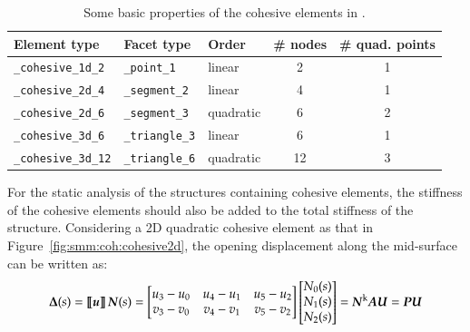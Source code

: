 \begin{table}[!htb]
\begin{center}
\begin{tabular}{l|llcc}
\toprule
Element type & Facet type & Order & \# nodes & \# quad. points  \\
\midrule
\texttt{\_cohesive\_1d\_2} & \texttt{\_point\_1} & linear & 2 & 1  \\
\hline
\texttt{\_cohesive\_2d\_4} & \texttt{\_segment\_2} & linear & 4 & 1  \\
\texttt{\_cohesive\_2d\_6} & \texttt{\_segment\_3} & quadratic & 6 & 2  \\
\hline
\texttt{\_cohesive\_3d\_6} & \texttt{\_triangle\_3} & linear & 6 & 1  \\
\texttt{\_cohesive\_3d\_12} & \texttt{\_triangle\_6} & quadratic & 12 & 3  \\
\bottomrule
\end{tabular}
\end{center}
\caption{Some basic properties of the cohesive elements in \akantu.}
\label{tab:cohesive_elements}
\end{table}

For the static analysis of the structures containing cohesive
elements, the stiffness of the cohesive elements should also be added
to the total stiffness of the structure. Considering a 2D quadratic
cohesive element as that in Figure~\ref{fig:smm:coh:cohesive2d}, the
opening displacement along the mid-surface can be written as:
\begin{equation}
  \label{eq:opening}
  \boldsymbol{\Delta}(s) = \llbracket \boldsymbol{u}\rrbracket \,\boldsymbol{N}(s) =
  \begin{bmatrix}
    u_3-u_0 & u_4-u_1 & u_5-u_2\\
    v_3-v_0 & v_4-v_1 & v_5-v_2
  \end{bmatrix}
  \begin{bmatrix}
    N_0(s) \\ N_1(s) \\ N_2(s)
  \end{bmatrix} =
  \boldsymbol{N}^\mathrm{k} \boldsymbol{A U} = \boldsymbol{PU}
\end{equation}

